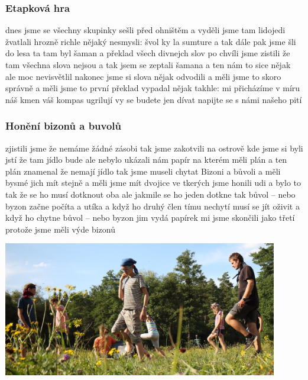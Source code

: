 

\subsubsection{Etapková hra} %
\label{ssub:etapková_hra}
	
dnes jsme se všechny skupinky sešli před ohništěm a vyděli jsme tam lidojedi žvatlali hrozně richle nějaký nesmysli: švol ky la sumture a tak dále pak jsme šli do lesa ta tam byl šaman a překlad všech divnejch slov po chvíli jsme zistili že tam všechna slova nejsou a tak jsem se zeptali šamana a ten nám to sice nějak ale moc nevisvětlil nakonec jsme si slova nějak odvodili a měli jsme to skoro správně a měli jsme to první překlad vypadal nějak takhle: mi přicházíme v míru náš kmen váš kompas ugrilují vy se budete jen dívat napijte se s námi našeho pití


\clearpage

\subsubsection{Honění bizonů a buvolů} %
\label{ssub:honění_bizonů_a_buvolů}

zjistili jsme že nemáme žádné zásobi tak jsme zakotvili na ostrově kde jsme si byli jstí že tam jídlo bude ale nebylo ukázali nám papír na kterém měli plán a ten plán znamenal že nemají jídlo tak jsme museli chytat Bizoni a bůvoli a měli bysmé jich mít stejně a měli jsme mít dvojice ve tkerých jsme honili udi a bylo to tak že se ho musí dotknout oba ale jakmile se ho jeden dotkne tak bůvol – nebo byzon začne počíta a utíka a když ho druhý člen tímu nechytí musí se jít oživit a když ho chytne bůvol – nebo byzon jim vydá papírek mi jsme skončili jako třetí protože jsme měli výde bizonů

\begin{center}
	\includegraphics[width=12cm]{img/anpetu_tabor/hra.jpg}
\end{center}

